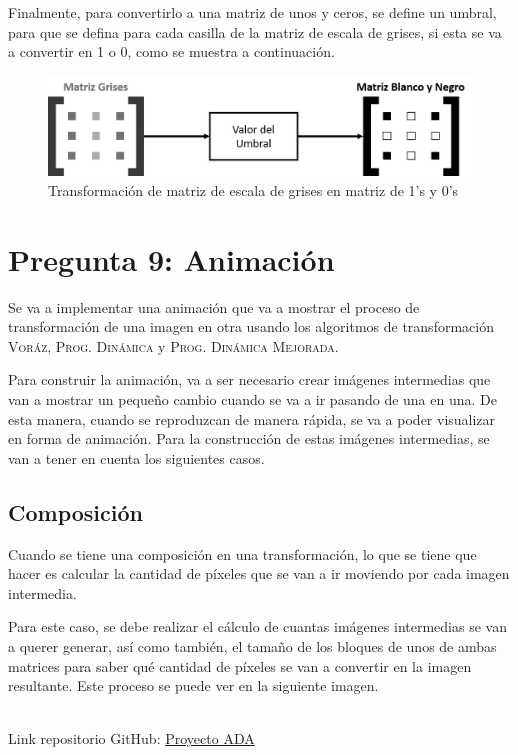 \documentclass[conference]{IEEEtran}
\begin{document}
Finalmente, para convertirlo a una matriz de unos y ceros, se define un umbral, para que se defina para cada casilla de la matriz de escala de grises, si esta se va a convertir en 1 o 0, como se muestra a continuación.

\begin{figure}[H]
  \centering
  \includegraphics[scale=0.35]{images/matriz_negro.png}
  \caption[Negro]{Transformación de matriz de escala de grises en matriz de 1's y 0's}
  \label{fig:negro}
\end{figure}

\section{Pregunta 9: Animación}
Se va a implementar una animación que va a mostrar el proceso de transformación de una imagen en otra usando los algoritmos de transformación \textsc{Voráz}, \textsc{
Prog. Dinámica} y \textsc{Prog. Dinámica Mejorada}.

Para construir la animación, va a ser necesario crear imágenes intermedias que van a mostrar un pequeño cambio cuando se va a ir pasando de una en una. De esta manera, cuando se reproduzcan de manera rápida, se va a poder visualizar en forma de animación. Para la construcción de estas imágenes intermedias, se van a tener en cuenta los siguientes casos.

\subsection{Composición}
Cuando se tiene una composición en una transformación, lo que se tiene que hacer es calcular la cantidad de píxeles que se van a ir moviendo por cada imagen intermedia.

Para este caso, se debe realizar el cálculo de cuantas imágenes intermedias se van a querer generar, así como también, el tamaño de los bloques de unos de ambas matrices para saber qué cantidad de píxeles se van a convertir en la imagen resultante. Este proceso se puede ver en la siguiente imagen.

\renewcommand{\appendixname}{Anexos}
\renewcommand{\appendixtocname}{Anexos}
\renewcommand{\appendixpagename}{Anexos}

\appendix
\verb||\\
Link repositorio GitHub: \href{https://github.com/Piero16301/Proyecto_ADA.git}{\underline{Proyecto ADA}}
\end{document}
